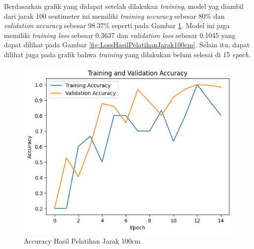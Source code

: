 Berdasarkan grafik yang didapat setelah dilakukan \emph{training}, model yag diambil dari jarak 100 sentimeter ini memiliki \emph{training accuracy} sebesar 80\% dan \emph{validation accuracy} sebesar 98.37\% seperti pada Gambar \ref{fig:AccuracyHasilPelatihanJarak100cm}. Model ini juga memiliki \emph{training loss} sebesar 0.3637 dan \emph{validation loss} sebesar 0.1045 yang dapat dilihat pada Gambar \ref{fig:LossHasilPelatihanJarak100cm}. Selain itu, dapat dilihat juga pada grafik bahwa \emph{training} yang dilakukan belum selesai di 15 \emph{epoch}. 


\begin{figure} [H] \centering
  \includegraphics[scale=0.7]{gambar/100accuracy.png}
  \caption{Accuracy Hasil Pelatihan Jarak 100cm}
  \label{fig:AccuracyHasilPelatihanJarak100cm}
\end{figure}

